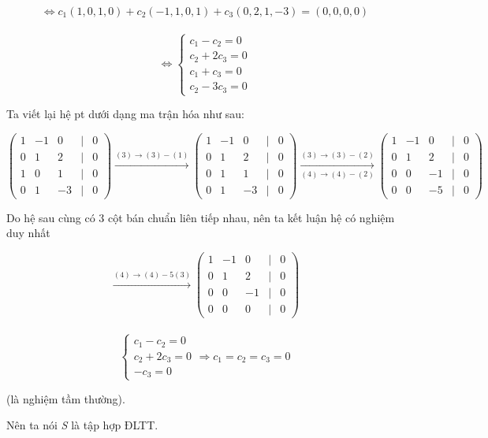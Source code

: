 \documentclass[12pt,a4paper]{article}
\begin{document}
\[ \Leftrightarrow c_1(1, 0, 1, 0) + c_2(-1, 1, 0, 1) + c_3(0, 2, 1, -3) = (0, 0, 0, 0) \] \\ \[ \Leftrightarrow \begin{cases} c_1 - c_2 = 0 \\ c_2 + 2c_3 = 0 \\ c_1 + c_3 = 0 \\ c_2 - 3c_3 = 0 \end{cases} \]

Ta viết lại hệ pt dưới dạng ma trận hóa như sau:

\[ \begin{pmatrix} 1 & -1 & 0 & | & 0 \\ 0 & 1 & 2 & | & 0 \\ 1 & 0 & 1 & | & 0 \\ 0 & 1 & -3 & | & 0 \end{pmatrix} \xrightarrow{(3) \rightarrow (3) - (1)} \begin{pmatrix} 1 & -1 & 0 & | & 0 \\ 0 & 1 & 2 & | & 0 \\ 0 & 1 & 1 & | & 0 \\ 0 & 1 & -3 & | & 0 \end{pmatrix} \xrightarrow[(4) \rightarrow (4) - (2)]{(3) \rightarrow (3) - (2)} \begin{pmatrix} 1 & -1 & 0 & | & 0 \\ 0 & 1 & 2 & | & 0 \\ 0 & 0 & -1 & | & 0 \\ 0 & 0 & -5 & | & 0 \end{pmatrix} \]

Do hệ sau cùng có 3 cột bán chuẩn liên tiếp nhau, nên ta kết luận hệ có
nghiệm duy nhất

\[ \xrightarrow{(4) \rightarrow (4) - 5(3)} \begin{pmatrix} 1 & -1 & 0 & | & 0 \\ 0 & 1 & 2 & | & 0 \\ 0 & 0 & -1 & | & 0 \\ 0 & 0 & 0 & | & 0 \end{pmatrix} \] \\ \[ \begin{cases} c_1 - c_2 = 0 \\ c_2 + 2c_3 = 0 \\ -c_3 = 0 \end{cases} \Rightarrow c_1 = c_2 = c_3 = 0 \]

(là nghiệm tầm thường).

Nên ta nói \emph{S} là tập hợp ĐLTT.
\end{document}

